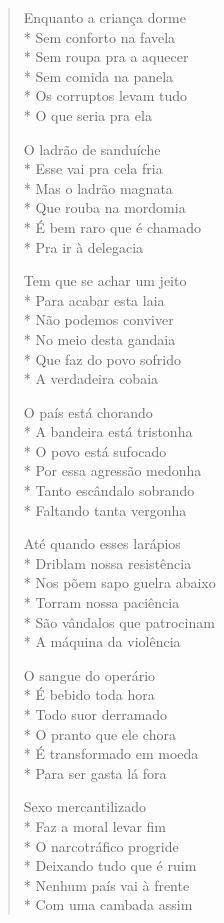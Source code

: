 \begin{verse}
Enquanto a criança dorme\\*
Sem conforto na favela\\*
Sem roupa pra a aquecer\\*
Sem comida na panela\\*
Os corruptos levam tudo\\*
O que seria pra ela

O ladrão de sanduíche\\*
Esse vai pra cela fria\\*
Mas o ladrão magnata\\*
Que rouba na mordomia\\*
É bem raro que é chamado\\*
Pra ir à delegacia

Tem que se achar um jeito\\*
Para acabar esta laia\\*
Não podemos conviver\\*
No meio desta gandaia\\*
Que faz do povo sofrido\\*
A verdadeira cobaia

O país está chorando\\*
A bandeira está tristonha\\*
O povo está sufocado\\*
Por essa agressão medonha\\*
Tanto escândalo sobrando\\*
Faltando tanta vergonha

Até quando esses larápios\\*
Driblam nossa resistência\\*
Nos põem sapo guelra abaixo\\*
Torram nossa paciência\\*
São vândalos que patrocinam\\*
A máquina da violência

O sangue do operário\\*
É bebido toda hora\\*
Todo suor derramado\\*
O pranto que ele chora\\*
É transformado em moeda\\*
Para ser gasta lá fora

Sexo mercantilizado\\*
Faz a moral levar fim\\*
O narcotráfico progride\\*
Deixando tudo que é ruim\\*
Nenhum país vai à frente\\*
Com uma cambada assim


\end{verse}
